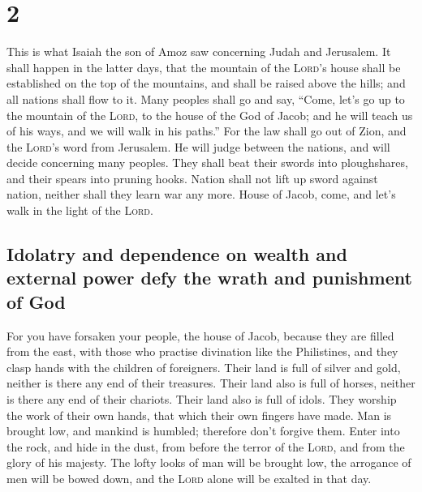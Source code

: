 \hypertarget{section-1}{%
\section{2}\label{section-1}}

 This is what Isaiah the son of Amoz saw concerning Judah
and Jerusalem.  It shall happen in the latter days, that
the mountain of the \textsc{Lord}'s house shall be established on the
top of the mountains, and shall be raised above the hills; and all
nations shall flow to it.  Many peoples shall go and say,
``Come, let's go up to the mountain of the \textsc{Lord}, to the house
of the God of Jacob; and he will teach us of his ways, and we will walk
in his paths.'' For the law shall go out of Zion, and the
\textsc{Lord}'s word from Jerusalem.  He will judge
between the nations, and will decide concerning many peoples. They shall
beat their swords into ploughshares, and their spears into pruning
hooks. Nation shall not lift up sword against nation, neither shall they
learn war any more.  House of Jacob, come, and let's walk
in the light of the \textsc{Lord}.

\hypertarget{idolatry-and-dependence-on-wealth-and-external-power-defy-the-wrath-and-punishment-of-god}{%
\subsection{Idolatry and dependence on wealth and external power defy
the wrath and punishment of
God}\label{idolatry-and-dependence-on-wealth-and-external-power-defy-the-wrath-and-punishment-of-god}}

 For you have forsaken your people, the house of Jacob,
because they are filled from the east, with those who practise
divination like the Philistines, and they clasp hands with the children
of foreigners.  Their land is full of silver and gold,
neither is there any end of their treasures. Their land also is full of
horses, neither is there any end of their chariots.  Their
land also is full of idols. They worship the work of their own hands,
that which their own fingers have made.  Man is brought
low, and mankind is humbled; therefore don't forgive them.
 Enter into the rock, and hide in the dust, from before
the terror of the \textsc{Lord}, and from the glory of his majesty.
 The lofty looks of man will be brought low, the
arrogance of men will be bowed down, and the \textsc{Lord} alone will be
exalted in that day.

